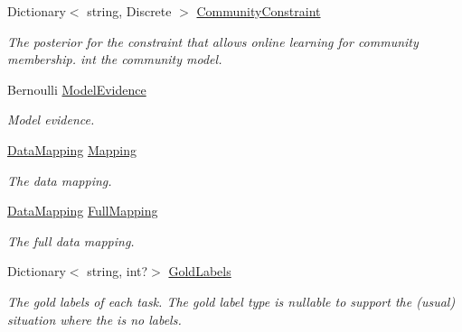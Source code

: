 \begin{DoxyCompactItemize}
Dictionary$<$ string, Discrete $>$ \hyperlink{class_crowdsourcing_models_1_1_results_a71e11daa6e177bb987bb488c576e5ac5}{Community\+Constraint}
\begin{DoxyCompactList}\small\item\em The posterior for the constraint that allows online learning for community membership. int the community model. \end{DoxyCompactList}\item 
Bernoulli \hyperlink{class_crowdsourcing_models_1_1_results_ad7d3df074d2f06c1d4c979a03b371e98}{Model\+Evidence}
\begin{DoxyCompactList}\small\item\em Model evidence. \end{DoxyCompactList}\item 
\hyperlink{class_crowdsourcing_models_1_1_data_mapping}{Data\+Mapping} \hyperlink{class_crowdsourcing_models_1_1_results_ad5b164d844e8bace19604f8cf056e4fe}{Mapping}
\begin{DoxyCompactList}\small\item\em The data mapping. \end{DoxyCompactList}\item 
\hyperlink{class_crowdsourcing_models_1_1_data_mapping}{Data\+Mapping} \hyperlink{class_crowdsourcing_models_1_1_results_a8ec786eadd78965d983b08cc44a650dc}{Full\+Mapping}
\begin{DoxyCompactList}\small\item\em The full data mapping. \end{DoxyCompactList}\item 
Dictionary$<$ string, int?$>$ \hyperlink{class_crowdsourcing_models_1_1_results_a25fe8942765452821d24ed2b7fe9a472}{Gold\+Labels}
\begin{DoxyCompactList}\small\item\em The gold labels of each task. The gold label type is nullable to support the (usual) situation where the is no labels. \end{DoxyCompactList}\item 

\end{DoxyCompactItemize}
